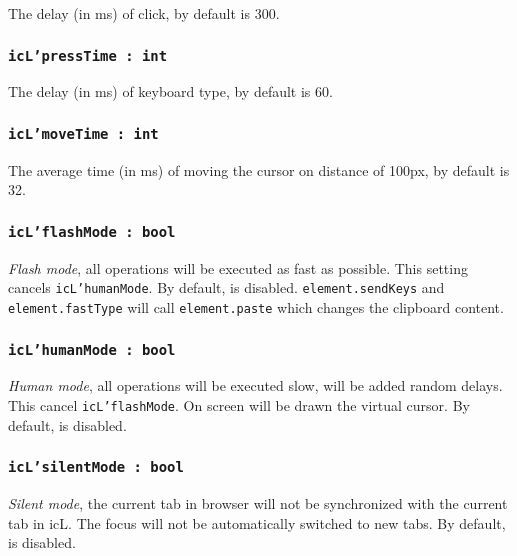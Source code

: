 The delay (in ms) of click, by default is 300.

\subsubsection{\texttt{icL'pressTime : int}}

The delay (in ms) of keyboard type, by default is 60.

\subsubsection{\texttt{icL'moveTime : int}}

The average time (in ms) of moving the cursor on distance of 100px, by default is 32.

\subsubsection{\texttt{icL'flashMode : bool}}

{\it Flash mode}, all operations will be executed as fast as possible. This setting cancels \texttt{icL'humanMode}. By default, is disabled. \texttt{element.sendKeys} and \texttt{element.fastType} will call \texttt{element.paste} which changes the clipboard content.

\subsubsection{\texttt{icL'humanMode : bool}}

{\it Human mode}, all operations will be executed slow, will be added random delays. This cancel \texttt{icL'flashMode}. On screen will be drawn the virtual cursor. By default, is disabled.

\subsubsection{\texttt{icL'silentMode : bool}}

{\it Silent mode}, the current tab in browser will not be synchronized with the current tab in icL. The focus will not be automatically switched to new tabs. By default, is disabled.
